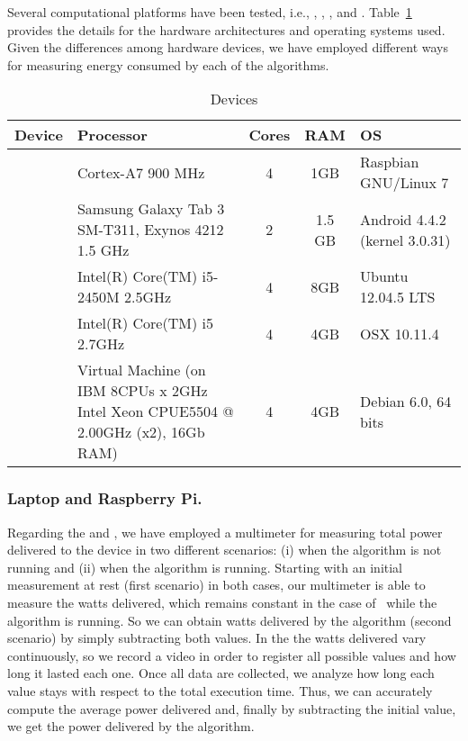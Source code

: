 Several computational platforms have been tested, i.e., \raspberrynsp, \tabletnsp, \laptopnsp, \iMac and \bladensp.  Table~\ref{Table:devices} provides the details for the hardware architectures and operating systems used. Given the differences among hardware devices, we have employed different ways  %
for measuring energy consumed by each of the algorithms.  

\begin{table}[!t]
\centering
\caption{Devices}
\label{Table:devices}
\begin{tabular}{lp{4.5cm}ccp{3cm}} \hline
Device		&	Processor			&	Cores	&	RAM &	OS		\\ 
\hline
\raspberry   	& Cortex-A7 900 MHz			&	 4 	&	1GB &	Raspbian GNU/Linux 7	\\
\tablet		& Samsung Galaxy Tab 3 SM-T311, Exynos 4212 1.5 GHz& 2  & 1.5 GB &	Android	4.4.2 (kernel 3.0.31) \\
\laptop 		& Intel(R) Core(TM) i5-2450M 2.5GHz	&	4	&	8GB &	Ubuntu 12.04.5 LTS \\
\iMac		& Intel(R) Core(TM) i5 2.7GHz	& 4	& 4GB 	&OSX 10.11.4			\\
\blade		& Virtual Machine (on IBM 8CPUs x 2GHz Intel Xeon CPUE5504 @ 2.00GHz (x2), 16Gb RAM) & 4 & 4GB & Debian 6.0, 64 bits\\
\hline
\end{tabular}
\end{table}


\subsubsection*{Laptop and Raspberry Pi.}
Regarding the \laptop and \raspberrynsp, we have employed a multimeter
for measuring total power delivered to the device in two different scenarios:  (i) when the algorithm is 
not running and (ii) when the algorithm is running.  Starting with an initial measurement at rest (first scenario) in both cases, our multimeter is able to measure the watts 
delivered, which remains constant in the case of \raspberrynsp~while the algorithm is running. So we can obtain watts delivered by the algorithm (second scenario) by 
simply subtracting both values. 
In the \laptop the watts delivered vary continuously, so we record a video in order to register all possible values and how long it lasted each one. Once all data are 
collected, we analyze how long each value stays with respect to the total execution time. Thus, we can accurately compute the average power delivered and, finally 
by subtracting the initial value, we get the power delivered by the algorithm. %

